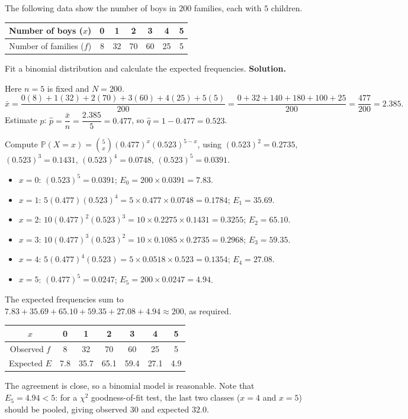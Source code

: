 \documentclass[11pt]{article}
\begin{document}
\begin{exoresolu}
The following data show the number of boys in $200$ families, each with $5$ children.
\begin{center}
\begin{tabular}{|c|cccccc|}\hline
Number of boys ($x$) & 0 & 1 & 2 & 3 & 4 & 5 \\ \hline
Number of families ($f$) & 8 & 32 & 70 & 60 & 25 & 5 \\ \hline
\end{tabular}
\end{center}
Fit a binomial distribution and calculate the expected frequencies.
\tcblower
\textbf{Solution.}

Here $n = 5$ is fixed and $N = 200$.
\[
\bar{x} = \frac{0(8) + 1(32) + 2(70) + 3(60) + 4(25) + 5(5)}{200}
= \frac{0 + 32 + 140 + 180 + 100 + 25}{200} = \frac{477}{200} = 2.385.
\]
Estimate $p$: $\hat{p} = \dfrac{\bar{x}}{n} = \dfrac{2.385}{5} = 0.477$, so $\hat{q} = 1 - 0.477 = 0.523$.

Compute $\mathbb{P}(X = x) = \binom{5}{x} (0.477)^x (0.523)^{5-x}$, using
$(0.523)^2 = 0.2735$, $(0.523)^3 = 0.1431$, $(0.523)^4 = 0.0748$, $(0.523)^5 = 0.0391$.
\begin{itemize}
\item $x=0$: $(0.523)^5 = 0.0391$; \quad $E_0 = 200 \times 0.0391 = 7.83$.
\item $x=1$: $5(0.477)(0.523)^4 = 5 \times 0.477 \times 0.0748 = 0.1784$; \quad $E_1 = 35.69$.
\item $x=2$: $10(0.477)^2(0.523)^3 = 10 \times 0.2275 \times 0.1431 = 0.3255$; \quad $E_2 = 65.10$.
\item $x=3$: $10(0.477)^3(0.523)^2 = 10 \times 0.1085 \times 0.2735 = 0.2968$; \quad $E_3 = 59.35$.
\item $x=4$: $5(0.477)^4(0.523) = 5 \times 0.0518 \times 0.523 = 0.1354$; \quad $E_4 = 27.08$.
\item $x=5$: $(0.477)^5 = 0.0247$; \quad $E_5 = 200 \times 0.0247 = 4.94$.
\end{itemize}
The expected frequencies sum to $7.83 + 35.69 + 65.10 + 59.35 + 27.08 + 4.94 \approx 200$, as required.
\begin{center}
\begin{tabular}{|c|cccccc|}\hline
$x$ & 0 & 1 & 2 & 3 & 4 & 5 \\ \hline
Observed $f$ & 8 & 32 & 70 & 60 & 25 & 5 \\ \hline
Expected $E$ & 7.8 & 35.7 & 65.1 & 59.4 & 27.1 & 4.9 \\ \hline
\end{tabular}
\end{center}
The agreement is close, so a binomial model is reasonable. Note that $E_5 = 4.94 < 5$: for a $\chi^2$ goodness-of-fit test, the last two classes ($x=4$ and $x=5$) should be pooled, giving observed $30$ and expected $32.0$.
\end{exoresolu}
\end{document}

